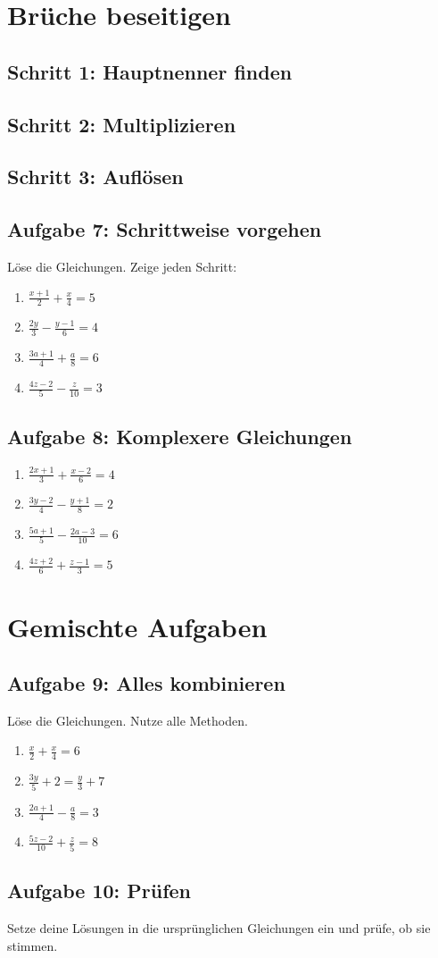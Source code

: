 \documentclass[12pt]{article}
\begin{document}
\section*{Brüche beseitigen}

\subsection*{Schritt 1: Hauptnenner finden}
\subsection*{Schritt 2: Multiplizieren}
\subsection*{Schritt 3: Auflösen}

\subsection*{Aufgabe 7: Schrittweise vorgehen}
Löse die Gleichungen. Zeige jeden Schritt:
\begin{enumerate}
  \item \(\frac{x + 1}{2} + \frac{x}{4} = 5\)
  \item \(\frac{2y}{3} - \frac{y - 1}{6} = 4\)
  \item \(\frac{3a + 1}{4} + \frac{a}{8} = 6\)
  \item \(\frac{4z - 2}{5} - \frac{z}{10} = 3\)
\end{enumerate}

\subsection*{Aufgabe 8: Komplexere Gleichungen}
\begin{enumerate}
  \item \(\frac{2x + 1}{3} + \frac{x - 2}{6} = 4\)
  \item \(\frac{3y - 2}{4} - \frac{y + 1}{8} = 2\)
  \item \(\frac{5a + 1}{5} - \frac{2a - 3}{10} = 6\)
  \item \(\frac{4z + 2}{6} + \frac{z - 1}{3} = 5\)
\end{enumerate}

\section*{Gemischte Aufgaben}

\subsection*{Aufgabe 9: Alles kombinieren}
Löse die Gleichungen. Nutze alle Methoden.
\begin{enumerate}
  \item \(\frac{x}{2} + \frac{x}{4} = 6\)
  \item \(\frac{3y}{5} + 2 = \frac{y}{3} + 7\)
  \item \(\frac{2a + 1}{4} - \frac{a}{8} = 3\)
  \item \(\frac{5z - 2}{10} + \frac{z}{5} = 8\)
\end{enumerate}

\subsection*{Aufgabe 10: Prüfen}
Setze deine Lösungen in die ursprünglichen Gleichungen ein und prüfe, ob sie stimmen.
\end{document}
